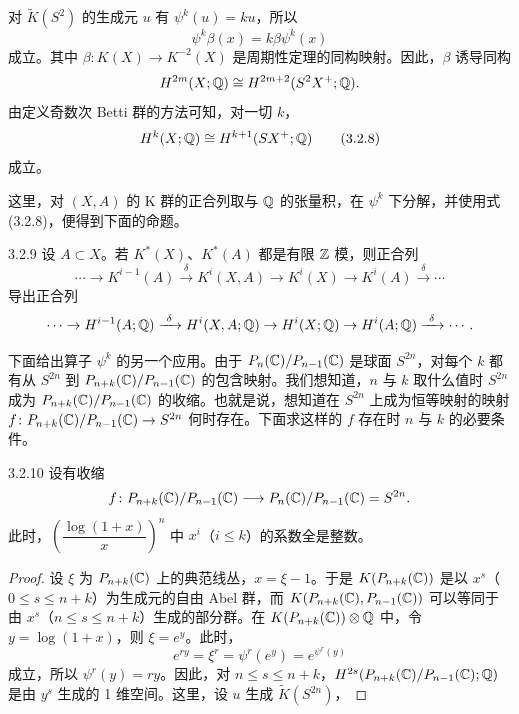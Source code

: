 对 $\tilde K(S^2)$ 的生成元 $u$ 有 $\psi^k(u)=ku$，所以
\[
\psi^k\beta(x)=k\beta\psi^k(x)
\]
成立。其中 $\beta\colon K(X)\to K^{-2}(X)$ 是周期性定理的同构映射。因此，$\beta$ 诱导同构
\[
H^{2m}(X;\mathbb{Q})\cong H^{2m+2}(S^2X^+;\mathbb{Q}).
\]
由定义奇数次 Betti 群的方法可知，对一切 $k$，
\begin{equation}
H^k(X;\mathbb{Q})\cong H^{k+1}(SX^+;\mathbb{Q}) \tag{3.2.8}
\end{equation}
成立。


这里，对 $(X,A)$ 的 K 群的正合列取与 $\mathbb{Q}$ 的张量积，在 $\psi^k$ 下分解，并使用式 (3.2.8)，便得到下面的命题。

\begin{proposition*}{3.2.9}
设 $A\subset X$。若 $K^*(X)$、$K^*(A)$ 都是有限 $\mathbb{Z}$ 模，则正合列
\[
\cdots\to K^{i-1}(A)\xrightarrow{\ \delta\ }K^i(X,A)\to K^i(X)\to K^i(A)\xrightarrow{\ \delta\ }\cdots
\]
导出正合列
\[
\cdots\to H^{i-1}(A;\mathbb{Q})\xrightarrow{\ \delta\ }H^i(X,A;\mathbb{Q})\to H^i(X;\mathbb{Q})\to H^i(A;\mathbb{Q})\xrightarrow{\ \delta\ }\cdots.
\]
\end{proposition*}

下面给出算子 $\psi^k$ 的另一个应用。由于 $P_n(\mathbb{C})/P_{n-1}(\mathbb{C})$ 是球面 $S^{2n}$，对每个 $k$ 都有从 $S^{2n}$ 到 $P_{n+k}(\mathbb{C})/P_{n-1}(\mathbb{C})$ 的包含映射。我们想知道，$n$ 与 $k$ 取什么值时 $S^{2n}$ 成为 $P_{n+k}(\mathbb{C})/P_{n-1}(\mathbb{C})$ 的收缩。也就是说，想知道在 $S^{2n}$ 上成为恒等映射的映射 $f\colon P_{n+k}(\mathbb{C})/P_{n-1}(\mathbb{C})\to S^{2n}$ 何时存在。下面求这样的 $f$ 存在时 $n$ 与 $k$ 的必要条件。

\begin{theorem*}{3.2.10}
设有收缩
\[
f\colon P_{n+k}(\mathbb{C})/P_{n-1}(\mathbb{C})\longrightarrow P_n(\mathbb{C})/P_{n-1}(\mathbb{C})=S^{2n}.
\]
此时，$\left(\dfrac{\log(1+x)}{x}\right)^n$ 中 $x^i$（$i\le k$）的系数全是整数。
\end{theorem*}

\begin{proof}
设 $\xi$ 为 $P_{n+k}(\mathbb{C})$ 上的典范线丛，$x=\xi-1$。于是 $K(P_{n+k}(\mathbb{C}))$ 是以 $x^s$（$0\le s\le n+k$）为生成元的自由 Abel 群，而 $K(P_{n+k}(\mathbb{C}),P_{n-1}(\mathbb{C}))$ 可以等同于由 $x^s$（$n\le s\le n+k$）生成的部分群。在 $K(P_{n+k}(\mathbb{C}))\otimes\mathbb{Q}$ 中，令 $y=\log(1+x)$，则 $\xi=e^y$。此时，
\[
e^{ry}=\xi^r=\psi^r(e^y)=e^{\psi^r(y)}
\]
成立，所以 $\psi^r(y)=ry$。因此，对 $n\le s\le n+k$，$H^{2s}(P_{n+k}(\mathbb{C})/P_{n-1}(\mathbb{C});\mathbb{Q})$ 是由 $y^s$ 生成的 1 维空间。这里，设 $u$ 生成 $\tilde K(S^{2n})$，
\end{proof}


